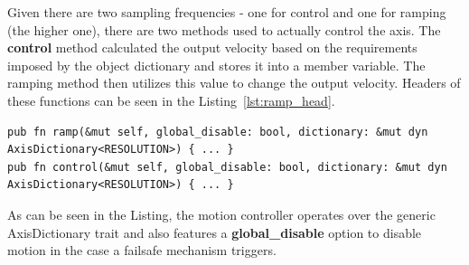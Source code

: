 Given there are two sampling frequencies - one for control and one for ramping (the higher one), there are two methods used to actually control the axis.
The \textbf{control} method calculated the output velocity based on the requirements imposed by the object dictionary and stores it into a member variable.
The ramping method then utilizes this value to change the output velocity.
Headers of these functions can be seen in the Listing~\ref{lst:ramp_head}.
\begin{lstlisting}[caption={Headers of the ramp and control functions.},label=lst:ramp_head]
pub fn ramp(&mut self, global_disable: bool, dictionary: &mut dyn AxisDictionary<RESOLUTION>) { ... }
pub fn control(&mut self, global_disable: bool, dictionary: &mut dyn AxisDictionary<RESOLUTION>) { ... }
\end{lstlisting}
As can be seen in the Listing, the motion controller operates over the generic AxisDictionary trait and also features a \textbf{global\_disable} option to disable motion in the case a failsafe mechanism triggers.
